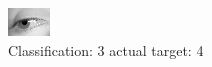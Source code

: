 \begin{figure}[h!]
\begin{center}
\includegraphics[width=0.60\columnwidth]{figures/ID3020_class_3_target_4.png}
\end{center}
\caption{ Classification: 3 actual target: 4}
\label{fig:ID3020_class_3_target_4}
\end{figure}
